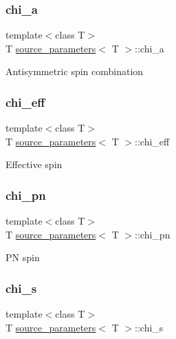 \subsubsection{\texorpdfstring{chi\+\_\+a}{chi\_a}}
{\footnotesize\ttfamily template$<$class T$>$ \\
T \hyperlink{structsource__parameters}{source\+\_\+parameters}$<$ T $>$\+::chi\+\_\+a}

Antisymmetric spin combination \mbox{\label{structsource__parameters_af76e6fbb66cdb45dc7ce96eb7ff1440c}} 
\subsubsection{\texorpdfstring{chi\+\_\+eff}{chi\_eff}}
{\footnotesize\ttfamily template$<$class T$>$ \\
T \hyperlink{structsource__parameters}{source\+\_\+parameters}$<$ T $>$\+::chi\+\_\+eff}

Effective spin \mbox{\label{structsource__parameters_aa1898ec9379fb825dd3a327292e7466e}} 
\subsubsection{\texorpdfstring{chi\+\_\+pn}{chi\_pn}}
{\footnotesize\ttfamily template$<$class T$>$ \\
T \hyperlink{structsource__parameters}{source\+\_\+parameters}$<$ T $>$\+::chi\+\_\+pn}

PN spin \mbox{\label{structsource__parameters_a795a4c996933c8096dc507fb4b77660c}} 
\subsubsection{\texorpdfstring{chi\+\_\+s}{chi\_s}}
{\footnotesize\ttfamily template$<$class T$>$ \\
T \hyperlink{structsource__parameters}{source\+\_\+parameters}$<$ T $>$\+::chi\+\_\+s}

